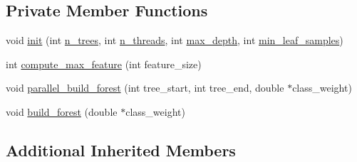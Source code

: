 \subsection*{Private Member Functions}
\begin{DoxyCompactItemize}
\item 
void \hyperlink{class_random_forest_classifier_a0a8a6b33668d878c0fc6772fc63c5ebf}{init} (int \hyperlink{class_base_forest_a2549a0057ec5419fe1de52ef198125ce}{n\+\_\+trees}, int \hyperlink{class_base_forest_a94fe86e1b426d149a11d100921cea3a4}{n\+\_\+threads}, int \hyperlink{class_base_forest_a85cf2e2e202c6e82bf684057181138f6}{max\+\_\+depth}, int \hyperlink{class_base_forest_a15e0407f3c0fbc4c25e0796c781ff059}{min\+\_\+leaf\+\_\+samples})
\item 
int \hyperlink{class_random_forest_classifier_a9fa7824a40995e37838c34e296538487}{compute\+\_\+max\+\_\+feature} (int feature\+\_\+size)
\item 
void \hyperlink{class_random_forest_classifier_a4298934ca4d0a44814c6d10f83aee2bf}{parallel\+\_\+build\+\_\+forest} (int tree\+\_\+start, int tree\+\_\+end, double $\ast$class\+\_\+weight)
\item 
void \hyperlink{class_random_forest_classifier_ae46a41b04945bd42658945769c5f4e24}{build\+\_\+forest} (double $\ast$class\+\_\+weight)
\end{DoxyCompactItemize}
\subsection*{Additional Inherited Members}


